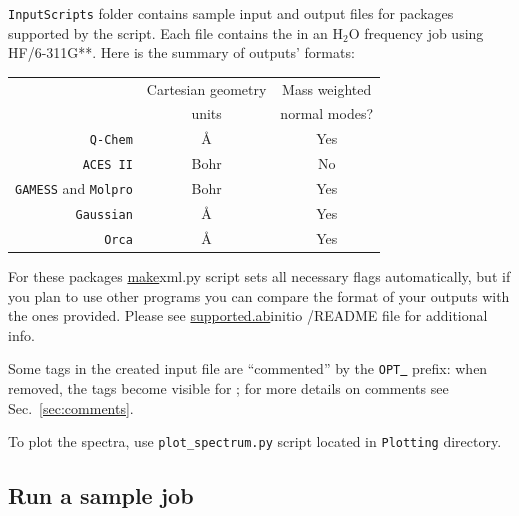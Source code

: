 \documentclass[11pt]{article}
\begin{document}
{\tt InputScripts} folder contains sample input and output files
for \ai packages supported by the script.
Each file contains the in an H$_2$O frequency job using HF/6-311G**.
Here is the summary of \ai outputs' formats:

\begin{center}
\begin{tabular}{rcc}
\hline
  & Cartesian geometry & Mass weighted\\
  & units              & normal modes? \\
\hline
{\tt Q-Chem} & \AA & Yes\\
{\tt ACES II}  & Bohr & No\\
{\tt GAMESS} and {\tt Molpro}  & Bohr & Yes\\
{\tt Gaussian}  & \AA & Yes\\
{\tt Orca}      & \AA  & Yes   \\
\hline
\end{tabular}
\end{center}

For these packages \ul{make}{xml.py} script sets all necessary flags automatically,
but if you plan to use other \ai programs you can compare the format of your
outputs with the ones provided. Please see \ul{supported.ab}{initio /README} 
file for additional info.

Some tags in the created input \xml file are ``commented'' by
the {\tt OPT\underline{~}} prefix: when removed, the tags become
visible for \ezFCF; for more details on comments see Sec.~\ref{sec:comments}.

To plot the spectra, use {\tt plot\_spectrum.py} script located in {\tt Plotting} directory.  

\subsection{Run a sample job}
\end{document}
